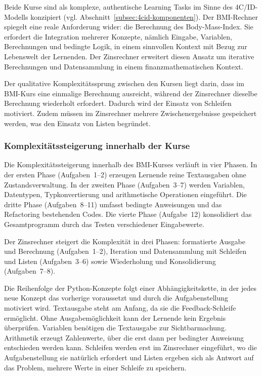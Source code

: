 Beide Kurse sind als komplexe, authentische Learning Tasks im Sinne des 4C/ID-Modells konzipiert (vgl. Abschnitt~\ref{subsec:4cid-komponenten}).
Der BMI-Rechner spiegelt eine reale Anforderung wider: die Berechnung des Body-Mass-Index.
Sie erfordert die Integration mehrerer Konzepte, nämlich Eingabe, Variablen, Berechnungen und bedingte Logik, in einem sinnvollen Kontext mit Bezug zur Lebenswelt der Lernenden.
Der Zinsrechner erweitert diesen Ansatz um iterative Berechnungen und Datensammlung in einem finanzmathematischen Kontext.

Der qualitative Komplexitätssprung zwischen den Kursen liegt darin, dass im BMI-Kurs eine einmalige Berechnung ausreicht, während der Zinsrechner dieselbe Berechnung wiederholt erfordert. Dadurch wird der Einsatz von Schleifen motiviert.
Zudem müssen im Zinsrechner mehrere Zwischenergebnisse gespeichert werden, was den Einsatz von Listen begründet.

\subsubsection{Komplexitätssteigerung innerhalb der Kurse}

Die Komplexitätssteigerung innerhalb des BMI-Kurses verläuft in vier Phasen.
In der ersten Phase (Aufgaben~1--2) erzeugen Lernende reine Textausgaben ohne Zustandsverwaltung.
In der zweiten Phase (Aufgaben~3--7) werden Variablen, Datentypen, Typkonvertierung und arithmetische Operationen eingeführt.
Die dritte Phase (Aufgaben~8--11) umfasst bedingte Anweisungen und das Refactoring bestehenden Codes.
Die vierte Phase (Aufgabe~12) konsolidiert das Gesamtprogramm durch das Testen verschiedener Eingabewerte.

Der Zinsrechner steigert die Komplexität in drei Phasen: formatierte Ausgabe und Berechnung (Aufgaben~1--2), Iteration und Datensammlung mit Schleifen und Listen (Aufgaben~3--6) sowie Wiederholung und Konsolidierung (Aufgaben~7--8).

Die Reihenfolge der Python-Konzepte folgt einer Abhängigkeitskette, in der jedes neue Konzept das vorherige voraussetzt und durch die Aufgabenstellung motiviert wird.
Textausgabe steht am Anfang, da sie die Feedback-Schleife ermöglicht. Ohne Ausgabemöglichkeit kann der Lernende kein Ergebnis überprüfen.
Variablen benötigen die Textausgabe zur Sichtbarmachung.
Arithmetik erzeugt Zahlenwerte, über die erst dann per bedingter Anweisung entschieden werden kann.
Schleifen werden erst im Zinsrechner eingeführt, wo die Aufgabenstellung sie natürlich erfordert und Listen ergeben sich als Antwort auf das Problem, mehrere Werte in einer Schleife zu speichern.

